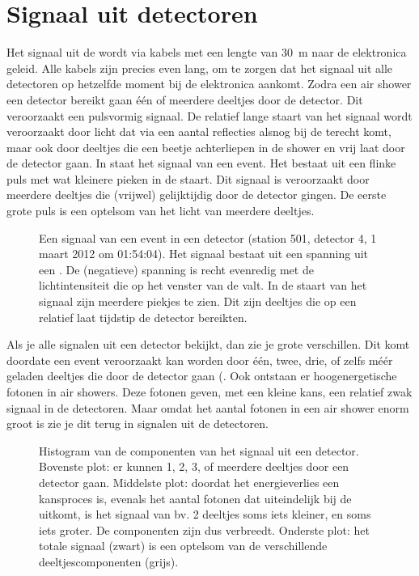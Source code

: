 \section{Signaal uit \hisparc detectoren}

Het signaal uit de \pmt wordt via kabels met een lengte van
\SI{30}{\meter} naar de \hisparc elektronica geleid.  Alle kabels zijn
precies even lang, om te zorgen dat het signaal uit alle detectoren op
hetzelfde moment bij de elektronica aankomt.  Zodra een air shower een
detector bereikt gaan één of meerdere deeltjes door de detector.  Dit
veroorzaakt een pulsvormig signaal.  De relatief lange staart van het
signaal wordt veroorzaakt door licht dat via een aantal reflecties alsnog
bij de \pmt terecht komt, maar ook door deeltjes die een beetje
achterliepen in de shower en vrij laat door de detector gaan.  In
 staat het signaal van een \hisparc event.  Het bestaat
uit een flinke puls met wat kleinere pieken in de staart.  Dit signaal is
veroorzaakt door meerdere deeltjes die (vrijwel) gelijktijdig door de
detector gingen.  De eerste grote puls is een optelsom van het licht van
meerdere deeltjes.

\begin{figure}
\centering

\caption{Een signaal van een event in een \hisparc detector (station 501,
detector 4, 1 maart 2012 om 01:54:04).  Het signaal bestaat uit een
spanning uit een \pmt.  De (negatieve) spanning is recht evenredig met de
lichtintensiteit die op het venster van de \pmt valt.  In de staart van
het signaal zijn meerdere piekjes te zien.  Dit zijn deeltjes die op een
relatief laat tijdstip de detector bereikten.}
\label{fig:traces}
\end{figure}

Als je alle signalen uit een \hisparc detector bekijkt, dan zie je grote
verschillen.  Dit komt doordate een event veroorzaakt kan worden door één,
twee, drie, of zelfs méér geladen deeltjes die door de detector gaan
(.  Ook ontstaan er hoogenergetische
fotonen in air showers.  Deze fotonen geven, met een kleine kans, een
relatief zwak signaal in de detectoren.  Maar omdat het aantal fotonen in
een air shower enorm groot is zie je dit terug in signalen uit de \hisparc
detectoren.

\begin{figure}
\centering

\caption{Histogram van de componenten van het signaal uit een \hisparc
detector.  Bovenste plot: er kunnen 1, 2, 3, of meerdere deeltjes door een
detector gaan.  Middelste plot: doordat het energieverlies een kansproces
is, evenals het aantal fotonen dat uiteindelijk bij de \pmt uitkomt, is
het signaal van bv. 2 deeltjes soms iets kleiner, en soms iets groter.  De
componenten zijn dus verbreedt.  Onderste plot: het totale signaal (zwart)
is een optelsom van de verschillende deeltjescomponenten (grijs).}
\label{fig:spectrum_componenten}
\end{figure}


